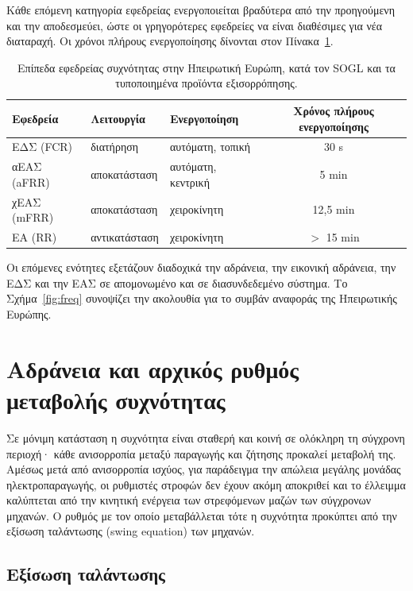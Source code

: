 Κάθε επόμενη κατηγορία εφεδρείας ενεργοποιείται βραδύτερα από την
προηγούμενη και την αποδεσμεύει, ώστε οι γρηγορότερες εφεδρείες να είναι διαθέσιμες για νέα
διαταραχή. Οι χρόνοι πλήρους ενεργοποίησης δίνονται στον Πίνακα~\ref{tab:reserves}.

\begin{table}[!htbp]
\centering
\begin{tabular}{lllc}
\hline
Εφεδρεία & Λειτουργία & Ενεργοποίηση & Χρόνος πλήρους ενεργοποίησης \\
\hline
ΕΔΣ (FCR)   & διατήρηση      & αυτόματη, τοπική   & 30 s \\
αΕΑΣ (aFRR) & αποκατάσταση   & αυτόματη, κεντρική & 5 min \\
χΕΑΣ (mFRR) & αποκατάσταση   & χειροκίνητη        & 12,5 min \\
ΕΑ (RR)     & αντικατάσταση  & χειροκίνητη        & $>$ 15 min \\
\hline
\end{tabular}
\caption{Επίπεδα εφεδρείας συχνότητας στην Ηπειρωτική Ευρώπη, κατά τον SOGL και τα
τυποποιημένα προϊόντα εξισορρόπησης.}
\label{tab:reserves}
\end{table}

Οι επόμενες ενότητες εξετάζουν διαδοχικά την αδράνεια, την εικονική αδράνεια, την ΕΔΣ και
την ΕΑΣ σε απομονωμένο και σε διασυνδεδεμένο σύστημα. Το Σχήμα~\ref{fig:freq} συνοψίζει
την ακολουθία για το συμβάν αναφοράς της Ηπειρωτικής Ευρώπης.

\section{Αδράνεια και αρχικός ρυθμός μεταβολής συχνότητας}
\label{sec:inertia}

Σε μόνιμη κατάσταση η συχνότητα είναι σταθερή και κοινή σε ολόκληρη τη σύγχρονη
περιοχή· κάθε ανισορροπία μεταξύ παραγωγής και ζήτησης προκαλεί μεταβολή της. Αμέσως μετά από
ανισορροπία ισχύος, για παράδειγμα την απώλεια μεγάλης μονάδας ηλεκτροπαραγωγής, οι ρυθμιστές
στροφών δεν έχουν ακόμη αποκριθεί και το έλλειμμα καλύπτεται από την κινητική ενέργεια των
στρεφόμενων μαζών των σύγχρονων μηχανών. Ο ρυθμός με τον οποίο μεταβάλλεται τότε η συχνότητα
προκύπτει από την εξίσωση ταλάντωσης (swing equation) των μηχανών.

\subsection{Εξίσωση ταλάντωσης}
\label{sec:swing}

